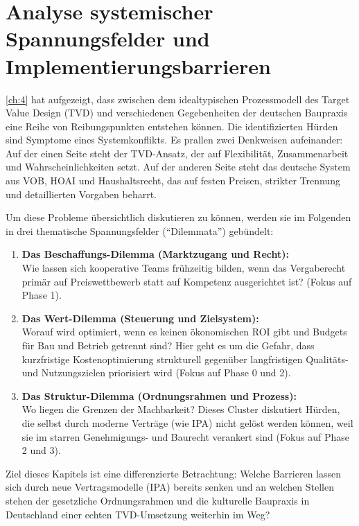 \chapter{Analyse systemischer Spannungsfelder und Implementierungsbarrieren}
\label{ch:5}

\cref{ch:4} hat aufgezeigt, dass zwischen dem idealtypischen Prozessmodell des Target Value Design (\acs{TVD}) und verschiedenen Gegebenheiten der deutschen Baupraxis eine Reihe von Reibungspunkten entstehen können. Die identifizierten Hürden sind Symptome eines Systemkonflikts.
Es prallen zwei Denkweisen aufeinander: Auf der einen Seite steht der \acs{TVD}-Ansatz, der auf Flexibilität, Zusammenarbeit und Wahrscheinlichkeiten setzt. Auf der anderen Seite steht das deutsche System aus \acs{VOB}, \acs{HOAI} und Haushaltsrecht, das auf festen Preisen, strikter Trennung und detaillierten Vorgaben beharrt.

Um diese Probleme übersichtlich diskutieren zu können, werden sie im Folgenden in drei thematische Spannungsfelder (\enquote{Dilemmata}) gebündelt:

\begin{enumerate}
    \item \textbf{Das Beschaffungs-Dilemma (Marktzugang und Recht):}\\
    Wie lassen sich kooperative Teams frühzeitig bilden, wenn das Vergaberecht primär auf Preiswettbewerb statt auf Kompetenz ausgerichtet ist? (Fokus auf Phase 1).

    \item \textbf{Das Wert-Dilemma (Steuerung und Zielsystem):}\\
    Worauf wird optimiert, wenn es keinen ökonomischen \ac{ROI} gibt und Budgets für Bau und Betrieb getrennt sind? Hier geht es um die Gefahr, dass kurzfristige Kostenoptimierung strukturell gegenüber langfristigen Qualitäts- und Nutzungszielen priorisiert wird (Fokus auf Phase 0 und 2).

    \item \textbf{Das Struktur-Dilemma (Ordnungsrahmen und Prozess):}\\
    Wo liegen die Grenzen der Machbarkeit? Dieses Cluster diskutiert Hürden, die selbst durch moderne Verträge (wie \acs{IPA}) nicht gelöst werden können, weil sie im starren Genehmigungs- und Baurecht verankert sind (Fokus auf Phase 2 und 3).
\end{enumerate}

Ziel dieses Kapitels ist eine differenzierte Betrachtung: Welche Barrieren lassen sich durch neue Vertragsmodelle (\acs{IPA}) bereits senken und an welchen Stellen stehen der gesetzliche Ordnungsrahmen und die kulturelle Baupraxis in Deutschland einer echten \acs{TVD}-Umsetzung weiterhin im Weg?

